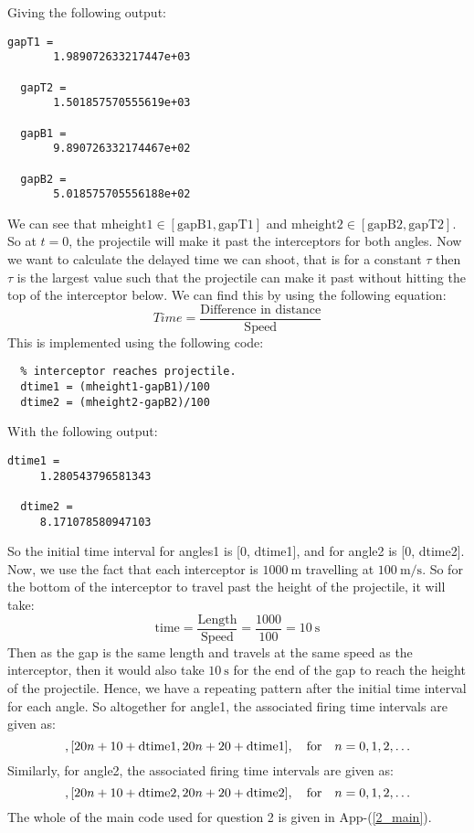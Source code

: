 \documentclass[12pt]{article}
\let\oldref\ref
\renewcommand{\ref}[1]{(\oldref{#1})}
\newcommand{\apref}[1]{App-\ref{#1}}
\begin{document}
Giving the following output:
\begin{lstlisting}[title={Gap motion output}]
  gapT1 =
       1.989072633217447e+03

  gapT2 =
       1.501857570555619e+03

  gapB1 =
       9.890726332174467e+02

  gapB2 =
       5.018575705556188e+02
\end{lstlisting}
We can see that $\text{mheight1}\in[\text{gapB1},\text{gapT1}]$ and $\text{mheight2}\in[\text{gapB2},\text{gapT2}]$. So at $t=0$, the projectile will make it past the interceptors for both angles. Now we want to calculate the delayed time we can shoot, that is for a constant $\tau$ then $\tau$ is the largest value such that the projectile can make it past without hitting the top of the interceptor below. We can find this by using the following equation:
\begin{equation*}
  Time = \frac{\text{Difference in distance}}{\text{Speed}}
\end{equation*}
This is implemented using the following code:
\begin{lstlisting}[title={Remaining time}]
  % Both projectials are in the gap, so calculate the delay time before
  % interceptor reaches projectile.
  dtime1 = (mheight1-gapB1)/100
  dtime2 = (mheight2-gapB2)/100
\end{lstlisting}
With the following output:
\begin{lstlisting}[title={Remaining time output}]
  dtime1 =
     1.280543796581343

  dtime2 =
     8.171078580947103
\end{lstlisting}
So the initial time interval for angles1 is [0, dtime1], and for angle2 is [0, dtime2]. Now, we use the fact that each interceptor is $\SI{1000}{\meter}$ travelling at $\SI{100}{\meter\per\second}$. So for the bottom of the interceptor to travel past the height of the projectile, it will take:
\begin{equation*}
  \text{time} = \frac{\text{Length}}{\text{Speed}} = \frac{1000}{100} = \SI{10}{\second}
\end{equation*}
Then as the gap is the same length and travels at the same speed as the interceptor, then it would also take $\SI{10}{\second}$ for the end of the gap to reach the height of the projectile. Hence, we have a repeating pattern after the initial time interval for each angle. So altogether for angle1, the associated firing time intervals are given as:
\begin{equation*}
  [0, \text{dtime1}], [20n+10+\text{dtime1}, 20n+20+\text{dtime1}], \qq{for} n=0,1,2,\ldots
\end{equation*}
Similarly, for angle2, the associated firing time intervals are given as:
\begin{equation*}
  [0, \text{dtime2}], [20n+10+\text{dtime2}, 20n+20+\text{dtime2}], \qq{for} n=0,1,2,\ldots
\end{equation*}
The whole of the main code used for question 2 is given in \apref{2_main}.
\end{document}
